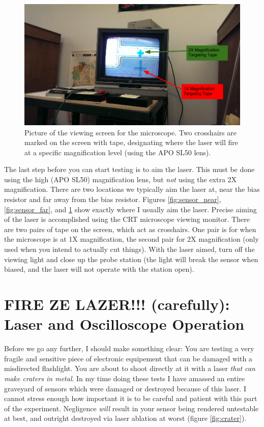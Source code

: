 \documentclass{report}
\begin{document}
            \begin{figure}[h] 
                \includegraphics[height=.4\textheight]{monitor}
                \centering
                \caption{ Picture of the viewing screen for the microscope. Two crosshairs are marked on the screen with tape, designating where the laser will fire at a specific magnification level (using the APO SL50 lens). }
                \label{fig:monitor}
            \end{figure}

            The last step before you can start testing is to aim the laser. This must be done using the high (APO SL50) magnification lens, but \textit{not} using the extra 2X magnification. There are two locations we typically aim the laser at, near the bias resistor and far away from the bias resistor. Figures \ref{fig:sensor_near}, \ref{fig:sensor_far}, and \ref{fig:monitor} show exactly where I usually aim the laser. Precise aiming of the laser is accomplished using the CRT microscope viewing monitor. There are two pairs of tape on the screen, which act as crosshairs. One pair is for when the microscope is at 1X magnification, the second pair for 2X magnification (only used when you intend to actually cut things). With the laser aimed, turn off the viewing light and close up the probe station (the light will break the sensor when biased, and the laser will not operate with the station open).

        \section{ FIRE ZE LAZER!!! (carefully): \\ Laser and Oscilloscope Operation }
            Before we go any further, I should make something clear: You are testing a very fragile and sensitive piece of electronic equipement that can be damaged with a misdirected flashlight. You are about to shoot directly at it with a laser \textit{that can make craters in metal}. In my time doing these tests I have amassed an entire graveyard of sensors which were damaged or destroyed because of this laser. I cannot stress enough how important it is to be careful and patient with this part of the experiment. Negligence \textit{will} result in your sensor being rendered untestable at best, and outright destroyed via laser ablation at worst (figure \ref{fig:crater}).
\end{document}
